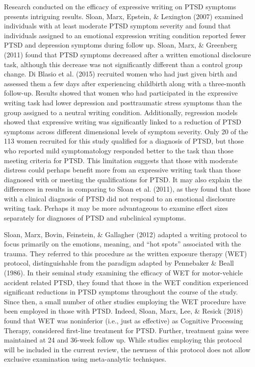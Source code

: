 \documentclass[man, mask]{apa6}
\theoremstyle{definition}
\theoremstyle{definition}
\theoremstyle{definition}
\theoremstyle{remark}
\begin{document}
Research conducted on the efficacy of expressive writing on PTSD
symptoms presents intriguing results. Sloan, Marx, Epstein, \& Lexington
(2007) examined individuals with at least moderate PTSD symptom severity
and found that individuals assigned to an emotional expression writing
condition reported fewer PTSD and depression symptoms during follow up.
Sloan, Marx, \& Greenberg (2011) found that PTSD symptoms decreased
after a written emotional disclosure task, although this decrease was
not significantly different than a control group change. Di Blasio et
al. (2015) recruited women who had just given birth and assessed them a
few days after experiencing childbirth along with a three-month
follow-up. Results showed that women who had participated in the
expressive writing task had lower depression and posttraumatic stress
symptoms than the group assigned to a neutral writing condition.
Additionally, regression models showed that expressive writing was
significantly linked to a reduction of PTSD symptoms across different
dimensional levels of symptom severity. Only 20 of the 113 women
recruited for this study qualified for a diagnosis of PTSD, but those
who reported mild symptomatology responded better to the task than those
meeting criteria for PTSD. This limitation suggests that those with
moderate distress could perhaps benefit more from an expressive writing
task than those diagnosed with or meeting the qualifications for PTSD.
It may also explain the differences in results in comparing to Sloan et
al. (2011), as they found that those with a clinical diagnosis of PTSD
did not respond to an emotional disclosure writing task. Perhaps it may
be more advantageous to examine effect sizes separately for diagnoses of
PTSD and subclinical symptoms.

Sloan, Marx, Bovin, Feinstein, \& Gallagher (2012) adapted a writing
protocol to focus primarily on the emotions, meaning, and \enquote{hot
spots} associated with the trauma. They referred to this procedure as
the written exposure therapy (WET) protocol, distinguishable from the
paradigm adapted by Pennebaker \& Beall (1986). In their seminal study
examining the efficacy of WET for motor-vehicle accident related PTSD,
they found that those in the WET condition experienced significant
reductions in PTSD symptoms throughout the course of the study. Since
then, a small number of other studies employing the WET procedure have
been employed in those with PTSD. Indeed, Sloan, Marx, Lee, \& Resick
(2018) found that WET was noninferior (i.e., just as effective) as
Cognitive Processing Therapy, considered first-line treatment for PTSD.
Further, treatment gains were maintained at 24 and 36-week follow up.
While studies employing this protocol will be included in the current
review, the newness of this protocol does not allow exclusive
examination using meta-analytic techniques.
\end{document}
